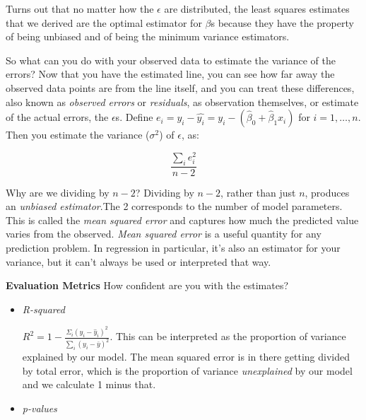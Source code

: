 \begin{tcolorbox}[enhanced jigsaw, breakable, pad at break*=1mm, colback=gray!20!white, colframe=black!85!black, title=\textbf{How to fit the model?}]
    Turns out that no matter how the \(\epsilon\) are distributed, the least squares estimates that we derived are the optimal estimator for \(\beta\)s because they have the property of being unbiased and of being the minimum variance estimators.
\end{tcolorbox}

So what can you do with your observed data to estimate the variance of the errors? Now that you have the estimated line, you can see how far away the observed data points are from the line itself, and you can treat these differences, also known as \textit{observed errors} or \textit{residuals}, as observation themselves, or estimate of the actual errors, the \(\epsilon\)s. Define \(e_{i}=y_{i}-\hat{y_{i}}=y_{i}-\left(\hat{\beta}_{0}+\hat{\beta}_{1} x_{i}\right)\) for \(i=1, \ldots, n\). Then you estimate the variance (\(\sigma^{2}\)) of \(\epsilon\), as:

\begin{equation}
    \frac{\sum_{i} e_{i}^{2}}{n-2}
\end{equation}

Why are we dividing by \(n-2\)? Dividing by \(n-2\), rather than just \(n\), produces an \textit{unbiased estimator}.The 2 corresponds to the number of model parameters. This is called the \textit{mean squared error} and captures how much the predicted value varies from the observed. \textit{Mean squared error} is a useful quantity for any prediction problem. In regression in particular, it's also an estimator for your variance, but it can't always be used or interpreted that way.

\textbf{Evaluation Metrics} How confident are you with the estimates?
\begin{itemize}
    \item \textit{R-squared}

          \(R^{2}=1-\frac{\Sigma_{i}\left(y_{i}-\hat{y}_{i}\right)^{2}}{\sum_{i}\left(y_{i}-\bar{y}\right)^{2}}\). This can be interpreted as the proportion of variance explained by our model. The mean squared error is in there getting divided by total error, which is the proportion of variance \textit{unexplained} by our model and we calculate 1 minus that.

    \item \textit{p-values}


\end{itemize}

